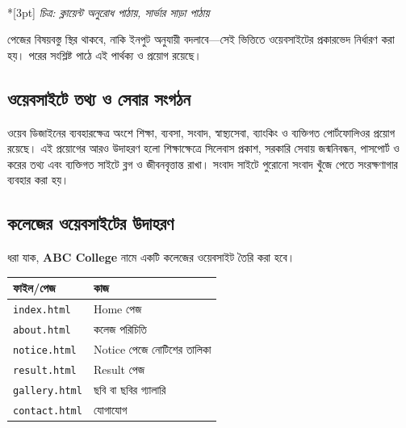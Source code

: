 \begin{center}
\\*[3pt]
\textit{চিত্র: ক্লায়েন্ট অনুরোধ পাঠায়, সার্ভার সাড়া পাঠায়}
\end{center}



পেজের বিষয়বস্তু স্থির থাকবে, নাকি ইনপুট অনুযায়ী বদলাবে—সেই ভিত্তিতে ওয়েবসাইটের প্রকারভেদ নির্ধারণ করা হয়। পরের সংশ্লিষ্ট পাঠে এই পার্থক্য ও প্রয়োগ রয়েছে।

\subsection{ওয়েবসাইটে তথ্য ও সেবার সংগঠন}
ওয়েব ডিজাইনের ব্যবহারক্ষেত্র অংশে শিক্ষা, ব্যবসা, সংবাদ, স্বাস্থ্যসেবা, ব্যাংকিং ও ব্যক্তিগত পোর্টফোলিওর প্রয়োগ রয়েছে। এই প্রয়োগের আরও উদাহরণ হলো শিক্ষাক্ষেত্রে সিলেবাস প্রকাশ, সরকারি সেবায় জন্মনিবন্ধন, পাসপোর্ট ও করের তথ্য এবং ব্যক্তিগত সাইটে ব্লগ ও জীবনবৃত্তান্ত রাখা। সংবাদ সাইটে পুরোনো সংবাদ খুঁজে পেতে সংরক্ষণাগার ব্যবহার করা হয়।

\subsection{কলেজের ওয়েবসাইটের উদাহরণ}

ধরা যাক, \textbf{ABC College} নামে একটি কলেজের ওয়েবসাইট তৈরি করা হবে।

\begin{center}
\begin{tabular}{|p{}|p{}|}
\hline
\textbf{ফাইল/পেজ} & \textbf{কাজ} \\
\hline
\texttt{index.html} & Home পেজ \\
\hline
\texttt{about.html} & কলেজ পরিচিতি \\
\hline
\texttt{notice.html} & Notice পেজে নোটিশের তালিকা \\
\hline
\texttt{result.html} & Result পেজ \\
\hline
\texttt{gallery.html} & ছবি বা ছবির গ্যালারি \\
\hline
\texttt{contact.html} & যোগাযোগ \\
\hline
\end{tabular}
\end{center}

